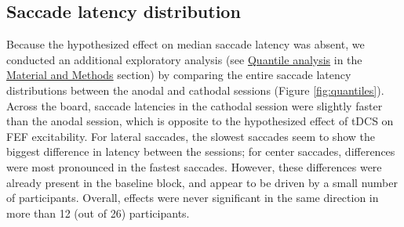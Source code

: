 \documentclass[11pt,english,]{memoir}
\begin{document}
\endgroup

\hypertarget{saccade-latency-distribution}{%
\subsection{Saccade latency distribution}\label{saccade-latency-distribution}}

Because the hypothesized effect on median saccade latency was absent, we conducted an additional exploratory analysis (see \protect\hyperlink{quantile-analysis}{Quantile analysis} in the \protect\hyperlink{sacc_tDCS-methods}{Material and Methods} section) by comparing the entire saccade latency distributions between the anodal and cathodal sessions (Figure \ref{fig:quantiles}). Across the board, saccade latencies in the cathodal session were slightly faster than the anodal session, which is opposite to the hypothesized effect of tDCS on FEF excitability. For lateral saccades, the slowest saccades seem to show the biggest difference in latency between the sessions; for center saccades, differences were most pronounced in the fastest saccades. However, these differences were already present in the baseline block, and appear to be driven by a small number of participants. Overall, effects were never significant in the same direction in more than 12 (out of 26) participants.
\end{document}
